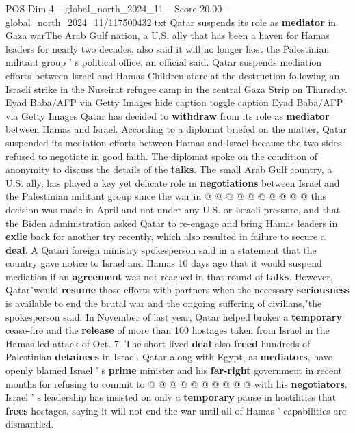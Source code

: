 \begin{textsample}{POS Dim 4 – global\_north\_2024\_11 – Score 20.00 – global\_north\_2024\_11/117500432.txt}  \label{ex:f4_pos_293}
Qatar suspends its role as \textbf{mediator} in Gaza warThe Arab Gulf nation, a U.S. ally that has been a haven for Hamas leaders for nearly two decades, also said it will no longer host the Palestinian militant group ' s political office, an official said.
Qatar suspends mediation efforts between Israel and Hamas Children stare at the destruction following an Israeli strike in the Nuseirat refugee camp in the central Gaza Strip on Thursday.
Eyad Baba/AFP via Getty Images hide caption toggle caption Eyad Baba/AFP via Getty Images Qatar has decided to \textbf{withdraw} from its role as \textbf{mediator} between Hamas and Israel.
According to a diplomat briefed on the matter, Qatar suspended its mediation efforts between Hamas and Israel because the two sides refused to negotiate in good faith.
The diplomat spoke on the condition of anonymity to discuss the details of the \textbf{talks}.
The small Arab Gulf country, a U.S. ally, has played a key yet delicate role in \textbf{negotiations} between Israel and the Palestinian militant group since the war in @ @ @ @ @ @ @ @ @ @ this decision was made in April and not under any U.S. or Israeli pressure, and that the Biden administration asked Qatar to re-engage and bring Hamas leaders in \textbf{exile} back for another try recently, which also resulted in failure to secure a \textbf{deal}.
A Qatari foreign ministry spokesperson said in a statement that the country gave notice to Israel and Hamas 10 days ago that it would suspend mediation if an \textbf{agreement} was not reached in that round of \textbf{talks}.
However, Qatar"would \textbf{resume} those efforts with partners when the necessary \textbf{seriousness} is available to end the brutal war and the ongoing suffering of civilians,"the spokesperson said.
In November of last year, Qatar helped broker a \textbf{temporary} cease-fire and the \textbf{release} of more than 100 hostages taken from Israel in the Hamas-led attack of Oct. 7.
The short-lived \textbf{deal} also \textbf{freed} hundreds of Palestinian \textbf{detainees} in Israel.
Qatar along with Egypt, as \textbf{mediators}, have openly blamed Israel ' s \textbf{prime} minister and his \textbf{far-right} government in recent months for refusing to commit to @ @ @ @ @ @ @ @ @ @ with his \textbf{negotiators}.
Israel ' s leadership has insisted on only a \textbf{temporary} pause in hostilities that \textbf{frees} hostages, saying it will not end the war until all of Hamas ' capabilities are dismantled.

\end{textsample}
